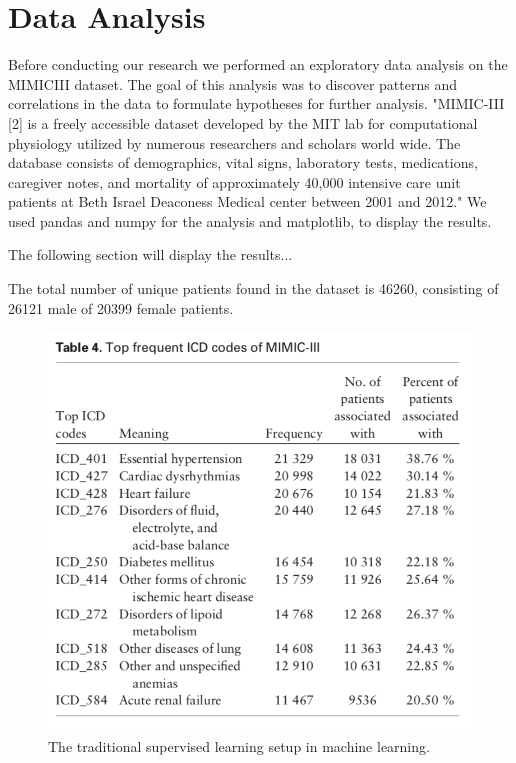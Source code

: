 \documentclass[11pt, a4paper]{book}
\begin{document}
\chapter{Data Analysis}
Before conducting our research we performed an exploratory data analysis on the MIMICIII dataset. The goal of this analysis was to discover patterns and correlations in the data to formulate hypotheses for further analysis. "MIMIC-III [2] is a freely accessible dataset developed by the MIT lab for computational physiology utilized by numerous researchers and scholars world wide. The database consists of demographics, vital signs, laboratory tests, medications, caregiver notes, and mortality of approximately 40,000 intensive care unit patients at Beth Israel Deaconess Medical center between 2001 and 2012." \cite{arya2019exploratory}
We used pandas and numpy for the analysis and matplotlib, to display the results.

The following section will display the results...

The total number of unique patients found in the dataset is 46260, consisting of 26121 male of 20399 female patients.

\begin{figure}
  \begin{center}
  \includegraphics[width=1\textwidth]{icd_top_frequency}
  \caption{The traditional supervised learning setup in machine learning. \cite{Ruder2019}}
  \label{fig:transfer_learning_no}
  \end{center}
\end{figure}
\end{document}
